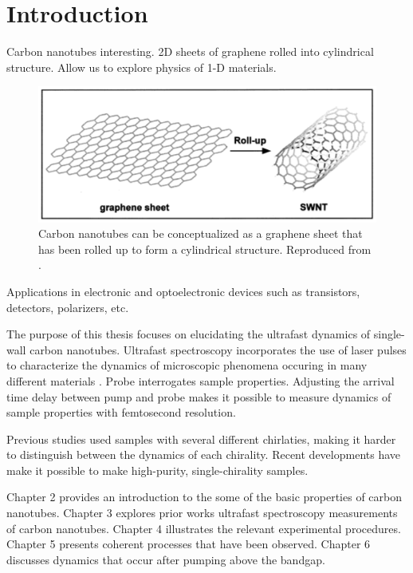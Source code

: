 \chapter{Introduction}

Carbon nanotubes interesting. 2D sheets of graphene rolled into cylindrical structure. Allow us to explore physics of 1-D materials. 

\begin{figure}[H]
	\centering
	\includegraphics{images/chapter_intro/rolled_up_graphene.png}
	\caption{Carbon nanotubes can be conceptualized as a graphene sheet that has been rolled up to form a cylindrical structure. Reproduced from \cite{odom2000structure}.}
\end{figure}

Applications in electronic and optoelectronic devices such as transistors, detectors, polarizers, etc. 

The purpose of this thesis focuses on elucidating the ultrafast dynamics of single-wall carbon nanotubes. Ultrafast spectroscopy incorporates the use of laser pulses to characterize the dynamics of microscopic phenomena occuring in many different materials \cite{shah1996ultrafast}. Probe interrogates sample properties. Adjusting the arrival time delay between pump and probe makes it possible to measure dynamics of sample properties with femtosecond resolution.

Previous studies used samples with several different chirlaties, making it harder to distinguish between the dynamics of each chirality. Recent developments have make it possible to make high-purity, single-chirality samples. 

Chapter 2 provides an introduction to the some of the basic properties of carbon nanotubes. Chapter 3 explores prior works ultrafast spectroscopy measurements of carbon nanotubes. Chapter 4 illustrates the relevant experimental procedures. Chapter 5 presents coherent processes that have been observed. Chapter 6 discusses dynamics that occur after pumping above the bandgap.
